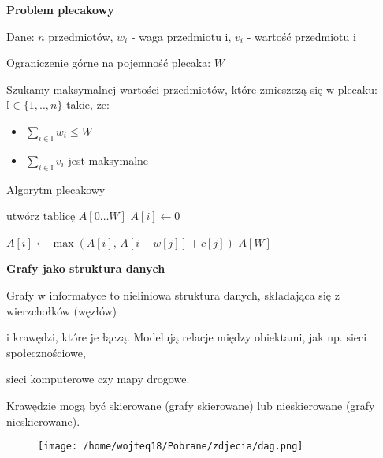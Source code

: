 \documentclass{article}
\begin{document}
    \vspace{1\baselineskip}
    \textbf{Problem plecakowy} \par
    Dane: $n$ przedmiotów, $w_i$ - waga przedmiotu i, $v_i$ - wartość przedmiotu i \par
    Ograniczenie górne na pojemność plecaka: $W$ \par
    Szukamy maksymalnej wartości przedmiotów, które zmieszczą się w plecaku: 
    $\mathbb{I} \in \{1, .., n\}$ takie, że:
    \begin{itemize}
        \item $\sum_{i \in \mathbb{I}} w_i \leq W$
        \item $\sum_{i \in \mathbb{I}} v_i$ jest maksymalne
    \end{itemize}
    \begin{algorithm}[H]
        \caption{Algorytm plecakowy}\label{alg:knapsack}
        \begin{algorithmic}[1]
                \State $\text{utwórz tablicę } A[0 \dots W]$
                    \State $A[i] \gets 0$
                \EndFor
    
                            \State $A[i] \gets \max\left(A[i],\, A[i - w[j]] + c[j]\right)$
                        \EndIf
                    \EndFor
                \EndFor
                \State \Return $A[W]$
            \EndProcedure
        \end{algorithmic}
    \end{algorithm}
    \newpage
    \textbf{Grafy jako struktura danych} \par
    \vspace{1\baselineskip}
    Grafy w informatyce to nieliniowa struktura danych, składająca się z wierzchołków (węzłów) \par
     i krawędzi, które je łączą. Modelują relacje między obiektami, jak np. sieci społecznościowe, \par sieci komputerowe czy mapy drogowe. 
     \par Krawędzie mogą być skierowane (grafy skierowane) lub nieskierowane (grafy nieskierowane). \par
     \vspace{1\baselineskip}
     \begin{figure}[H]
        \centering
        \texttt{[image: /home/wojteq18/Pobrane/zdjecia/dag.png]}
        \label{fig:example_image}
    \end{figure} \par
\end{document}
